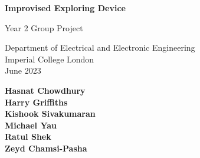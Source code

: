 \begin{titlepage}
    \begin{center}
        \vspace*{1cm}

        \Huge
        \textbf{Improvised Exploring Device}
        \vspace{0.5cm}
        
        \LARGE
        Year 2 Group Project

        \vspace{1.5cm}
        
        Department of Electrical and Electronic Engineering \\
        Imperial College London \\
        June 2023

        \vfill

        \Large
        \textbf{Hasnat Chowdhury} \\
        \textbf{Harry Griffiths} \\
        \textbf{Kishook Sivakumaran} \\
        \textbf{Michael Yau} \\
        \textbf{Ratul Shek} \\
        \textbf{Zeyd Chamsi-Pasha}


    \end{center}
\end{titlepage}